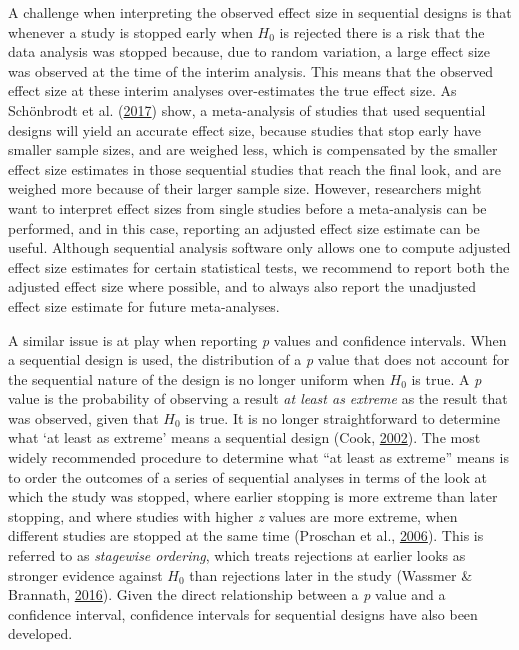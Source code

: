 \documentclass[
  english,
  ,man,floatsintext]{apa6}
\begin{document}
A challenge when interpreting the observed effect size in sequential designs is that whenever a study is stopped early when \(H_0\) is rejected there is a risk that the data analysis was stopped because, due to random variation, a large effect size was observed at the time of the interim analysis. This means that the observed effect size at these interim analyses over-estimates the true effect size. As Schönbrodt et al. (\protect\hyperlink{ref-schonbrodt_sequential_2017}{2017}) show, a meta-analysis of studies that used sequential designs will yield an accurate effect size, because studies that stop early have smaller sample sizes, and are weighed less, which is compensated by the smaller effect size estimates in those sequential studies that reach the final look, and are weighed more because of their larger sample size. However, researchers might want to interpret effect sizes from single studies before a meta-analysis can be performed, and in this case, reporting an adjusted effect size estimate can be useful. Although sequential analysis software only allows one to compute adjusted effect size estimates for certain statistical tests, we recommend to report both the adjusted effect size where possible, and to always also report the unadjusted effect size estimate for future meta-analyses.

A similar issue is at play when reporting \emph{p} values and confidence intervals. When a sequential design is used, the distribution of a \emph{p} value that does not account for the sequential nature of the design is no longer uniform when \(H_0\) is true. A \emph{p} value is the probability of observing a result \emph{at least as extreme} as the result that was observed, given that \(H_0\) is true. It is no longer straightforward to determine what `at least as extreme' means a sequential design (Cook, \protect\hyperlink{ref-cook_p-value_2002}{2002}). The most widely recommended procedure to determine what ``at least as extreme'' means is to order the outcomes of a series of sequential analyses in terms of the look at which the study was stopped, where earlier stopping is more extreme than later stopping, and where studies with higher \emph{z} values are more extreme, when different studies are stopped at the same time (Proschan et al., \protect\hyperlink{ref-proschan_statistical_2006}{2006}). This is referred to as \emph{stagewise ordering}, which treats rejections at earlier looks as stronger evidence against \(H_0\) than rejections later in the study (Wassmer \& Brannath, \protect\hyperlink{ref-wassmer_group_2016}{2016}). Given the direct relationship between a \emph{p} value and a confidence interval, confidence intervals for sequential designs have also been developed.
\end{document}
